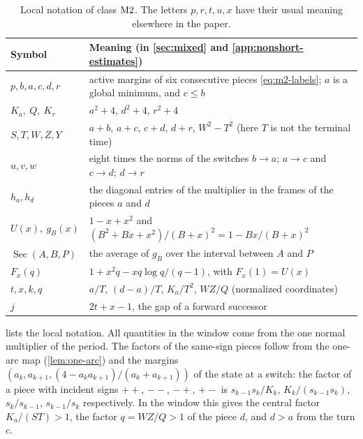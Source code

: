 \begin{table}[t]
\centering\small
\begin{tabular}{@{}l>{\raggedright\arraybackslash}p{}@{}}
\toprule
Symbol & Meaning (in \cref{sec:mixed} and \cref{app:nonshort-estimates})\\
\midrule
$p,b,a,c,d,r$ & active margins of six consecutive pieces \eqref{eq:m2-labels}; $a$ is a global
minimum, and $c\le b$\\
$K_a,\ Q,\ K_r$ & $a^2+4$, $d^2+4$, $r^2+4$\\
$S,T,W,Z,Y$ & $a+b$, $a+c$, $c+d$, $d+r$, $W^2-T^2$ (here $T$ is not the terminal time)\\
$u,v,w$ & eight times the norms of the switches $b\to a$; $a\to c$ and $c\to d$; $d\to r$\\
$h_a,h_d$ & the diagonal entries of the multiplier in the frames of the pieces $a$ and $d$\\
$U(x),\ g_B(x)$ & $1-x+x^2$ and $(B^2+Bx+x^2)/(B+x)^2=1-Bx/(B+x)^2$\\
$\operatorname{Sec}(A,B,P)$ & the average of $g_B$ over the interval between $A$ and $P$\\
$F_x(q)$ & $1+x^2q-xq\log q/(q-1)$, with $F_x(1)=U(x)$\\
$t,x,k,q$ & $a/T$, $(d-a)/T$, $K_a/T^2$, $WZ/Q$ (normalized coordinates)\\
$j$ & $2t+x-1$, the gap of a forward successor\\
\bottomrule
\end{tabular}
\caption{Local notation of class $\mathrm{M2}$. The letters $p,r,t,u,x$ have their usual meaning
elsewhere in the paper.}\label{tab:m2-notation}
\end{table}

 lists the local notation. All quantities in the window come from the one
normal multiplier of the period. The factors of the same-sign pieces follow from the one-arc map
(\cref{lem:one-arc}) and the margins $(a_k,a_{k+1},(4-a_ka_{k+1})/(a_k+a_{k+1}))$ of the state at a
switch: the factor of a piece with incident signs $++$, $--$, $-+$, $+-$ is $s_{k-1}s_k/K_k$,
$K_k/(s_{k-1}s_k)$, $s_k/s_{k-1}$, $s_{k-1}/s_k$ respectively. In the window this gives
the central factor $K_a/(ST)>1$, the factor $q=WZ/Q>1$ of the piece $d$, and $d>a$ from the turn
$c$.

